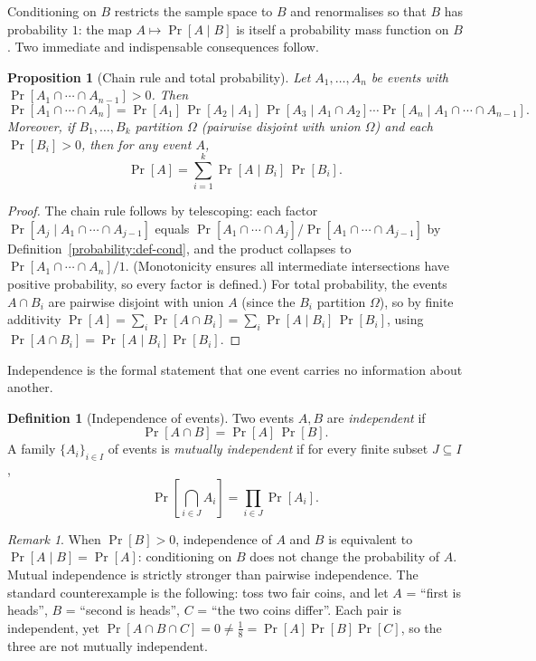 \documentclass[11pt,a4paper]{article}
\newtheorem{proposition}[theorem]{Proposition}
\theoremstyle{definition}
\newtheorem{definition}[theorem]{Definition}
\theoremstyle{remark}
\newtheorem{remark}[theorem]{Remark}
\begin{document}
Conditioning on \(B\) restricts the sample space to \(B\) and renormalises so that \(B\) has probability \(1\): the map \(A \mapsto \Pr[A \mid B]\) is itself a probability mass function on \(B\). Two immediate and indispensable consequences follow.

\begin{proposition}[Chain rule and total probability]\label{probability:prop-chain}
Let \(A_1, \dots, A_n\) be events with \(\Pr[A_1 \cap \cdots \cap A_{n-1}] > 0\). Then
\[
\Pr[A_1 \cap \cdots \cap A_n] = \Pr[A_1]\,\Pr[A_2 \mid A_1]\,\Pr[A_3 \mid A_1 \cap A_2]\cdots \Pr[A_n \mid A_1 \cap \cdots \cap A_{n-1}].
\]
Moreover, if \(B_1, \dots, B_k\) partition \(\Omega\) (pairwise disjoint with union \(\Omega\)) and each \(\Pr[B_i] > 0\), then for any event \(A\),
\[
\Pr[A] = \sum_{i=1}^{k} \Pr[A \mid B_i]\,\Pr[B_i].
\]
\end{proposition}

\begin{proof}
The chain rule follows by telescoping: each factor \(\Pr[A_{j} \mid A_1 \cap \cdots \cap A_{j-1}]\) equals \(\Pr[A_1 \cap \cdots \cap A_j]/\Pr[A_1 \cap \cdots \cap A_{j-1}]\) by Definition~\ref{probability:def-cond}, and the product collapses to \(\Pr[A_1 \cap \cdots \cap A_n]/1\). (Monotonicity ensures all intermediate intersections have positive probability, so every factor is defined.) For total probability, the events \(A \cap B_i\) are pairwise disjoint with union \(A\) (since the \(B_i\) partition \(\Omega\)), so by finite additivity \(\Pr[A] = \sum_i \Pr[A \cap B_i] = \sum_i \Pr[A \mid B_i]\,\Pr[B_i]\), using \(\Pr[A \cap B_i] = \Pr[A \mid B_i]\Pr[B_i]\).
\end{proof}

Independence is the formal statement that one event carries no information about another.

\begin{definition}[Independence of events]\label{probability:def-indep}
Two events \(A, B\) are \emph{independent} if
\[
\Pr[A \cap B] = \Pr[A]\,\Pr[B].
\]
A family \(\{A_i\}_{i \in I}\) of events is \emph{mutually independent} if for every finite subset \(J \subseteq I\),
\[
\Pr\!\left[\bigcap_{i \in J} A_i\right] = \prod_{i \in J} \Pr[A_i].
\]
\end{definition}

\begin{remark}\label{probability:rem-indep}
When \(\Pr[B] > 0\), independence of \(A\) and \(B\) is equivalent to \(\Pr[A \mid B] = \Pr[A]\): conditioning on \(B\) does not change the probability of \(A\). Mutual independence is strictly stronger than pairwise independence. The standard counterexample is the following: toss two fair coins, and let \(A\) = ``first is heads'', \(B\) = ``second is heads'', \(C\) = ``the two coins differ''. Each pair is independent, yet \(\Pr[A \cap B \cap C] = 0 \neq \tfrac18 = \Pr[A]\Pr[B]\Pr[C]\), so the three are not mutually independent.
\end{remark}
\end{document}
